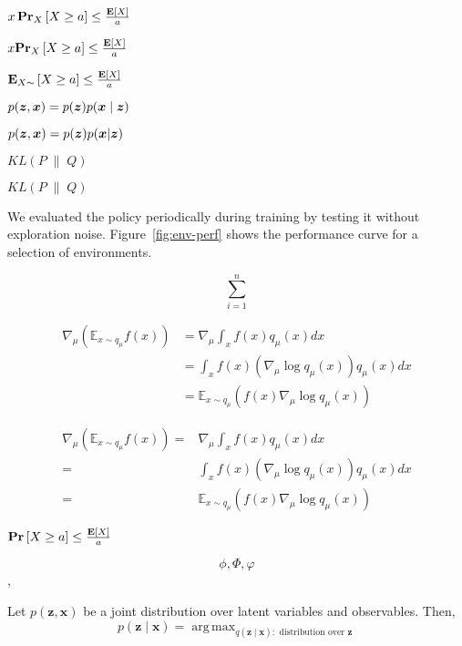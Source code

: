 \documentclass[11pt]{article}
\DeclareMathOperator*{\argmax}{arg\,max}
\begin{document}
$ x\operatorname*{\mathbf{Pr}}_{X} \left[ X \geq a \right] \leq \frac{\mathbf{E}[X]}{a}$

$ x\mathbf{Pr}_{X} \left[ X \geq a \right] \leq \frac{\mathbf{E}[X]}{a}$

$ \operatorname*{\mathbf{E}}_{X \sim} \left[ X \geq a \right] \leq \frac{\mathbf{E}[X]}{a}$


$p(\boldsymbol{z}, {\boldsymbol{x}}) = p(\boldsymbol{z}) p({\boldsymbol{x}} \mid \boldsymbol{z})$

$p(\boldsymbol{z}, {\boldsymbol{x}}) = p(\boldsymbol{z}) p({\boldsymbol{x}} | \boldsymbol{z})$

$KL \left( P \; \middle\| \; Q \right)$

$KL \left( P \; \middle\| \; Q \right)$


We evaluated the policy periodically during training by testing it without exploration noise.
Figure~\ref{fig:env-perf} shows the performance curve for a selection of environments.

$$\sum_{i=1}^n$$

\begin{align*}
    \nabla_{\mu} (\mathbb{E}_{x\sim q_{\mu}} f(x)) & = \nabla_{\mu} \int_x f(x) q_{\mu}(x) dx                                     \\
                                                   & =  \int_x f(x) (\nabla_{\mu} \log q_{\mu}(x))  q_{\mu}(x) dx                 \\
                                                   & = \mathbb{E}_{x \sim q_{\mu}} \left(f(x) \nabla_{\mu} \log q_{\mu}(x)\right)
\end{align*}

\begin{align*}
    \nabla_{\mu} (\mathbb{E}_{x\sim q_{\mu}} f(x))  = & \nabla_{\mu} \int_x f(x) q_{\mu}(x) dx                                     \\
    =                                                 & \int_x f(x) (\nabla_{\mu} \log q_{\mu}(x))  q_{\mu}(x) dx                  \\
    =                                                 & \mathbb{E}_{x \sim q_{\mu}} \left(f(x) \nabla_{\mu} \log q_{\mu}(x)\right)
\end{align*}

$ \operatorname*{\mathbf{Pr}} \left[ X \geq a \right] \leq \frac{\operatorname*{\mathbf{E}}[X]}{a}$

$$\phi, \Phi, \varphi$$ ,

\begin{theorem} \label{thm:gibbs}
    Let $p(\mathbf{z}, \mathbf{x})$ be a joint distribution over latent variables and observables. Then,
    $$p(\mathbf{z} \mid \mathbf{x}) = \argmax_{q(\mathbf{z} \mid \mathbf{x}) : \mbox{ distribution over } \mathbf{z}}$$
\end{theorem}
\end{document}
